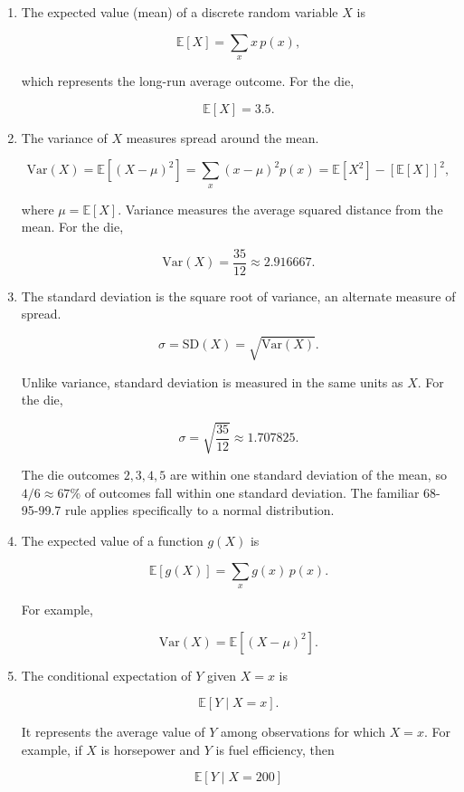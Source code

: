 \documentclass{article}
\begin{document}
\begin{enumerate}
\begin{enumerate}
For the die,

$$
p(x)=\frac{1}{6}, \qquad x=1,\ldots,6.
$$

\item The expected value (mean) of a discrete random variable $X$ is

$$
\mathbb{E}[X]=\sum_x x\,p(x),
$$

which represents the long-run average outcome. For the die,

$$
\mathbb{E}[X]=3.5.
$$

\item The variance of $X$ measures spread around the mean.

$$
\mathrm{Var}(X)=\mathbb{E}[(X-\mu)^2]
=\sum_x(x-\mu)^2p(x)
=\mathbb{E}[X^2]-[\mathbb{E}[X]]^2,
$$

where $\mu=\mathbb{E}[X]$. Variance measures the average squared distance from the mean. For the die,

$$
\mathrm{Var}(X)=\frac{35}{12}\approx 2.916667.
$$

\item The standard deviation is the square root of variance, an alternate measure of spread.

$$
\sigma=\mathrm{SD}(X)=\sqrt{\mathrm{Var}(X)}.
$$

Unlike variance, standard deviation is measured in the same units as $X$. For the die,

$$
\sigma=\sqrt{\frac{35}{12}}\approx1.707825.
$$

The die outcomes $2,3,4,5$ are within one standard deviation of the mean, so $4/6\approx67\%$ of outcomes fall within one standard deviation. The familiar 68-95-99.7 rule applies specifically to a normal distribution.

\item The expected value of a function $g(X)$ is

$$
\mathbb{E}[g(X)]=\sum_xg(x)\,p(x).
$$

For example,

$$
\mathrm{Var}(X)=\mathbb{E}[(X-\mu)^2].
$$

\item The conditional expectation of $Y$ given $X=x$ is

$$
\mathbb{E}[Y\mid X=x].
$$

It represents the average value of $Y$ among observations for which $X=x$. For example, if $X$ is horsepower and $Y$ is fuel efficiency, then

$$
\mathbb{E}[Y\mid X=200]
$$


\end{enumerate}
\end{enumerate}
\end{document}
